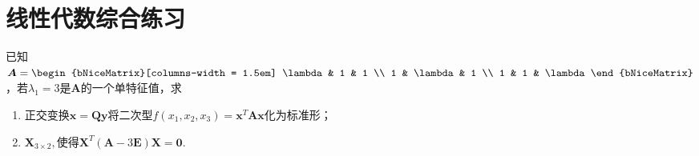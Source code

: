 \documentclass[12pt, a4paper, oneside, UTF8]{ctexbook}
\begin{document}
% 
\else
\fi
\chapter{线性代数综合练习}
\begin{exercise}
  已知$\bm{A}=\begin{bNiceMatrix}[columns-width = 1.5em]
    \lambda & 1 & 1 \\
    1 & \lambda & 1 \\
    1 & 1 & \lambda
    \end{bNiceMatrix}$，若$\lambda_1=3$是$\bm{A}$的一个单特征值，求\begin{enumerate}[label = (\arabic*)]
        \item 正交变换$\bm{x}=\bm{Q}\bm{y}$将二次型$f(x_1,x_2,x_3)=\bm{x}^T\bm{A}\bm{x}$化为标准形；
        \item $\bm{X}_{3 \times 2},$使得$\bm{X}^T(\bm{A}-3\bm{E})\bm{X}=\bm{0}$.
    \end{enumerate}
\end{exercise}
\end{document}
